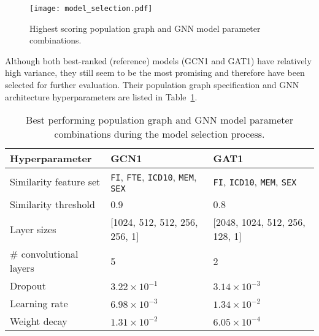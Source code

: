 

\begin{figure}[h]
    \centering
    \texttt{[image: model\_selection.pdf]}
    \caption{Highest scoring population graph and GNN model parameter combinations.}\label{figure:gat-gcn-rank}
\end{figure}

Although both best-ranked (reference) models (GCN1 and GAT1) have relatively high variance, they still seem to be the most promising and therefore have been selected for further evaluation. Their population graph specification and GNN architecture hyperparameters are listed in Table~\ref{table:best-hyperparameters}.

\begin{table}[]
    \caption{Best performing population graph and GNN model parameter combinations during the model selection process.}\label{table:best-hyperparameters}
    \centering
    \small
    \begin{tabular}{p{}p{}p{}}
        \hline
    \textbf{Hyperparameter} & \textbf{GCN1} & \textbf{GAT1} \\  \hline
        Similarity feature set & \texttt{FI}, \texttt{FTE}, \texttt{ICD10}, \texttt{MEM}, \texttt{SEX} & \texttt{FI}, \texttt{ICD10}, \texttt{MEM}, \texttt{SEX} \\
        Similarity threshold & 0.9 & 0.8 \\ \hline
        Layer sizes & [1024, 512, 512, 256, 256, 1] & [2048, 1024, 512, 256, 128, 1] \\
        \# convolutional layers & 5 & 2 \\
        Dropout & $3.22 \times 10^{-1}$ & $3.14 \times 10^{-3}$ \\
        Learning rate & $6.98 \times 10^{-3}$ & $1.34 \times 10^{-2}$ \\
        Weight decay & $1.31 \times 10^{-2}$ & $6.05 \times 10^{-4}$ \\ \hline
\end{tabular}
\end{table}

